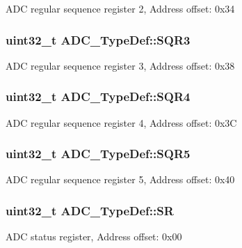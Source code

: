 A\-D\-C regular sequence register 2, Address offset\-: 0x34 \hypertarget{struct_a_d_c___type_def_a51dbdba74c4d3559157392109af68fc6}{
\subsubsection[{S\-Q\-R3}]{ uint32\-\_\-t A\-D\-C\-\_\-\-Type\-Def\-::\-S\-Q\-R3}}\label{struct_a_d_c___type_def_a51dbdba74c4d3559157392109af68fc6}
A\-D\-C regular sequence register 3, Address offset\-: 0x38 \hypertarget{struct_a_d_c___type_def_ab66c9816c1ca151a6ec728ec55655264}{
\subsubsection[{S\-Q\-R4}]{ uint32\-\_\-t A\-D\-C\-\_\-\-Type\-Def\-::\-S\-Q\-R4}}\label{struct_a_d_c___type_def_ab66c9816c1ca151a6ec728ec55655264}
A\-D\-C regular sequence register 4, Address offset\-: 0x3\-C \hypertarget{struct_a_d_c___type_def_a9cc66bea4b86f1312a7b34f931c3895a}{
\subsubsection[{S\-Q\-R5}]{ uint32\-\_\-t A\-D\-C\-\_\-\-Type\-Def\-::\-S\-Q\-R5}}\label{struct_a_d_c___type_def_a9cc66bea4b86f1312a7b34f931c3895a}
A\-D\-C regular sequence register 5, Address offset\-: 0x40 \hypertarget{struct_a_d_c___type_def_a9745df96e98f3cdc2d05ccefce681f64}{
\subsubsection[{S\-R}]{ uint32\-\_\-t A\-D\-C\-\_\-\-Type\-Def\-::\-S\-R}}\label{struct_a_d_c___type_def_a9745df96e98f3cdc2d05ccefce681f64}
A\-D\-C status register, Address offset\-: 0x00 

